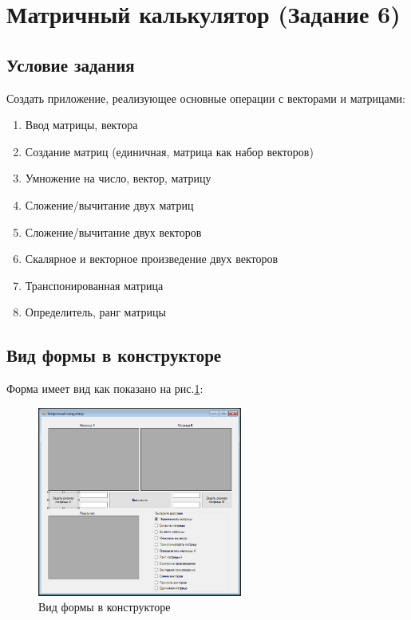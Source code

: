 \section{Матричный калькулятор (Задание 6)}

\subsection{Условие задания}

Создать приложение, реализующее основные операции с векторами и матрицами:

\begin{enumerate}
    \item{Ввод матрицы, вектора}
    \item{Создание матриц (единичная, матрица как набор векторов)}
    \item{Умножение на число, вектор, матрицу \cite{cite6}}
    \item{Сложение/вычитание двух матриц}
    \item{Сложение/вычитание двух векторов}
    \item{Скалярное и векторное произведение двух векторов}
    \item{Транспонированная матрица}
    \item{Определитель, ранг матрицы}
\end{enumerate}

\subsection{Вид формы в конструкторе}

Форма имеет вид как показано на рис.\ref{fig:FormInConstruct6}:

\begin{figure}[!h]
    \centering
    \includegraphics[width = 0.6\textwidth]{images/Task6/FormInConstructor.png}
    \caption{Вид формы в конструкторе}
    \label{fig:FormInConstruct6}
\end{figure}

